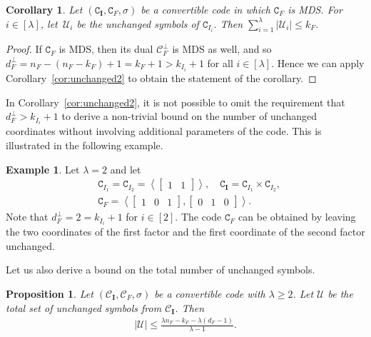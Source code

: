 \documentclass[conference, 10pt]{IEEEtran}
\theoremstyle{plain}
\newtheorem{corollary}[theorem]{Corollary}
\newtheorem{proposition}[theorem]{Proposition}
\theoremstyle{definition}
\newtheorem{example}[definition]{Example}
\newcommand{\C}{\mathtt{C}}
\newcommand{\mC}{\mathcal{C}}
\newcommand{\mU}{\mathcal{U}}
\begin{document}
\begin{corollary}\label{cor:finalMDSunchangup}
    Let $(\C_{\textbf{I}}, \C_F, \sigma)$ be a convertible code in which $\C_F$ is MDS. For $i \in [\lambda]$, let~$\mU_i$ be the unchanged symbols of $\C_{I_i}$. Then $\sum_{i=1}^{\lambda}|\mU_i| \leq k_F.$
\end{corollary}
\begin{proof}
If $\C_F$ is MDS, then its dual $\mC_F^\perp$ is MDS as well, and so $d^{\perp}_F =n_F-(n_F-k_F)+1= k_F + 1 > k_{I_i} + 1$ for all $i \in [\lambda]$. Hence we can apply Corollary~\ref{cor:unchanged2} to obtain the statement of the corollary.
\end{proof}

In Corollary~\ref{cor:unchanged2}, it is not possible to omit the requirement that $d^{\perp}_F > k_{I_i} + 1$ to derive a non-trivial bound on the number of unchanged coordinates without involving additional parameters of the code. This is illustrated in the following example. 

\begin{example}   
 Let $\lambda=2$ and let
 \begin{align*}
 &\C_{I_1}= \C_{I_2} = \left\langle \begin{bmatrix} 1 & 1 \end{bmatrix} \right\rangle, \quad \C_{\textbf{I}}  = \C_{I_1} \times \C_{I_2},\\
 &\C_F = \left\langle \begin{bmatrix} 1 & 0 & 1 \end{bmatrix}, \begin{bmatrix} 0 & 1 & 0  \end{bmatrix}  \right\rangle.
 \end{align*}
Note that $d_F^{\perp} = 2 = k_{I_i} +1$ for $i \in [2]$. The code $\C_F$ can be obtained by leaving the two coordinates of the first factor and the first coordinate of the second factor unchanged.
\end{example}

    
Let us also derive a bound on the total number of unchanged symbols.

\begin{proposition}\label{prop:totalunchanged}
Let $(\mC_{\textbf{I}},\mC_F,\sigma)$ be a convertible code with $\lambda\ge 2$. Let $\mU$ be the total set of unchanged symbols from $\mC_{\textbf{I}}$. Then
\begin{align*} |\mU|\le \frac{\lambda n_F-k_F-\lambda(d_F-1)}{\lambda-1}. \end{align*}
\end{proposition}
\end{document}
